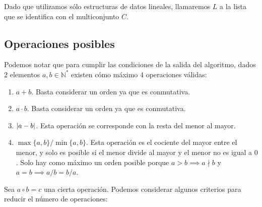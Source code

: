 Dado que utilizamos sólo estructuras de datos lineales, llamaremos $L$ a la lista
que se identifica con el multiconjunto $C$.

\subsection{Operaciones posibles}

Podemos notar que para cumplir las condiciones de la salida del algoritmo,
dados 2 elementos $a,b \in \mathbb{N}^{\ast}$ existen cómo máximo 4 operaciones válidas:

\begin{enumerate}
	\item $a+b$. Basta considerar un orden ya que es conmutativa.
	\item $a\cdot b$. Basta considerar un orden ya que es conmutativa.
	\item $|a-b|$. Esta operación se corresponde con la resta del menor al mayor.
	\item $\max\{a,b\}/\min\{a,b\}$. Esta operación es el cociente del mayor entre el menor, y solo es posible si el menor divide al mayor y el menor no es igual a $0$. Solo hay como máximo un orden posible porque $a > b \implies a \nmid b$ y $a = b \implies a/b = b/a$.
\end{enumerate}

Sea $a \circ b = c$ una cierta operación.
Podemos considerar algunos criterios para reducir el número de operaciones:

